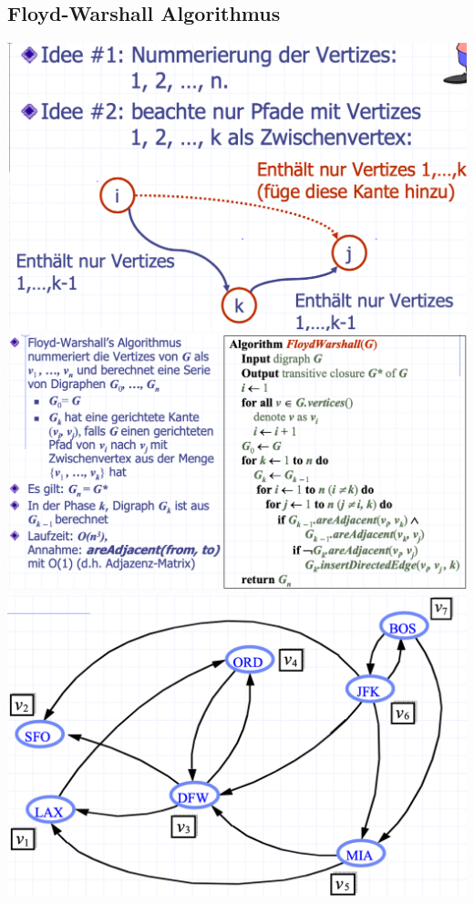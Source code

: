 \subsection{Floyd-Warshall Algorithmus}

\begin{center}
    \includegraphics[scale=.22]{graphic/14 Digraphs/Floyd-Warshall Algorithmus.png}
    \includegraphics[scale=.28]{graphic/14 Digraphs/Floyd-Warshall Algorithmus2.png}
    \includegraphics[scale=.22]{graphic/14 Digraphs/Floyd-Warshall Algorithmus3.png}
\end{center}
\vspace{-8pt}

